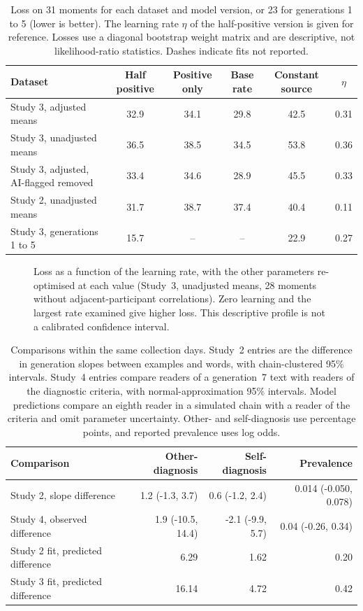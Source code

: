 \begin{table}[htbp]
\centering
\caption{Loss on 31 moments for each dataset and model version, or 23 for generations 1 to 5 (lower is better). The learning rate $\eta$ of the half-positive version is given for reference. Losses use a diagonal bootstrap weight matrix and are descriptive, not likelihood-ratio statistics. Dashes indicate fits not reported.}
\label{tab:losses}
\begingroup\small\setlength{\tabcolsep}{3.5pt}
\begin{tabular}{lccccc}
\toprule
Dataset & Half positive & Positive only & Base rate & Constant source & $\eta$ \\
\midrule
Study 3, adjusted means & 32.9 & 34.1 & 29.8 & 42.5 & 0.31 \\
Study 3, unadjusted means & 36.5 & 38.5 & 34.5 & 53.8 & 0.36 \\
Study 3, adjusted, AI-flagged removed & 33.4 & 34.6 & 28.9 & 45.5 & 0.33 \\
Study 2, unadjusted means & 31.7 & 38.7 & 37.4 & 40.4 & 0.11 \\
Study 3, generations 1 to 5 & 15.7 & -- & -- & 22.9 & 0.27 \\
\bottomrule
\end{tabular}\endgroup
\end{table}

\begin{figure}[htbp]
\centering
\figprofile
\caption{Loss as a function of the learning rate, with the other parameters re-optimised at each value (Study~3, unadjusted means, 28 moments without adjacent-participant correlations). Zero learning and the largest rate examined give higher loss. This descriptive profile is not a calibrated confidence interval.}
\label{fig:profile}
\end{figure}

\begin{table}[htbp]
\centering
\caption{Comparisons within the same collection days. Study~2 entries are the difference in generation slopes between examples and words, with chain-clustered 95\% intervals. Study~4 entries compare readers of a generation~7 text with readers of the diagnostic criteria, with normal-approximation 95\% intervals. Model predictions compare an eighth reader in a simulated chain with a reader of the criteria and omit parameter uncertainty. Other- and self-diagnosis use percentage points, and reported prevalence uses log odds.}
\label{tab:conditions}
\begingroup\small\setlength{\tabcolsep}{3.5pt}
\begin{tabular}{lrrr}
\toprule
Comparison & Other-diagnosis & Self-diagnosis & Prevalence \\
\midrule
Study 2, slope difference & 1.2 (-1.3, 3.7) & 0.6 (-1.2, 2.4) & 0.014 (-0.050, 0.078) \\
Study 4, observed difference & 1.9 (-10.5, 14.4) & -2.1 (-9.9, 5.7) & 0.04 (-0.26, 0.34) \\
Study 2 fit, predicted difference & 6.29 & 1.62 & 0.20 \\
Study 3 fit, predicted difference & 16.14 & 4.72 & 0.42 \\
\bottomrule\end{tabular}\endgroup\end{table}

